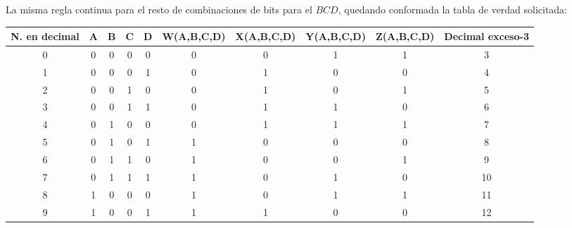 \noindent La misma regla continua para el resto de combinaciones de bits para el $BCD$, quedando conformada la tabla de verdad solicitada:
\begin{center}
\begin{tabular}{c|cccc|cccc|c}
\rowcolor[HTML]{FFFC9E} 
N. en decimal & A & B & C & D & \cellcolor[HTML]{FFCCC9}W(A,B,C,D) & \cellcolor[HTML]{FFCCC9}X(A,B,C,D) & \cellcolor[HTML]{FFCCC9}Y(A,B,C,D) & \cellcolor[HTML]{FFCCC9}Z(A,B,C,D) & \cellcolor[HTML]{FFCE93}Decimal exceso-3 \\ \hline
0             & 0 & 0 & 0 & 0 & 0                                  & 0                                  & 1                                  & 1                                  & 3                                        \\
1             & 0 & 0 & 0 & 1 & 0                                  & 1                                  & 0                                  & 0                                  & 4                                        \\
2             & 0 & 0 & 1 & 0 & 0                                  & 1                                  & 0                                  & 1                                  & 5                                        \\
3             & 0 & 0 & 1 & 1 & 0                                  & 1                                  & 1                                  & 0                                  & 6                                        \\
4             & 0 & 1 & 0 & 0 & 0                                  & 1                                  & 1                                  & 1                                  & 7                                        \\
5             & 0 & 1 & 0 & 1 & 1                                  & 0                                  & 0                                  & 0                                  & 8                                        \\
6             & 0 & 1 & 1 & 0 & 1                                  & 0                                  & 0                                  & 1                                  & 9                                        \\
7             & 0 & 1 & 1 & 1 & 1                                  & 0                                  & 1                                  & 0                                  & 10                                       \\
8             & 1 & 0 & 0 & 0 & 1                                  & 0                                  & 1                                  & 1                                  & 11                                       \\
9             & 1 & 0 & 0 & 1 & 1                                  & 1                                  & 0                                  & 0                                  & 12                                      
\end{tabular}
\end{center}

